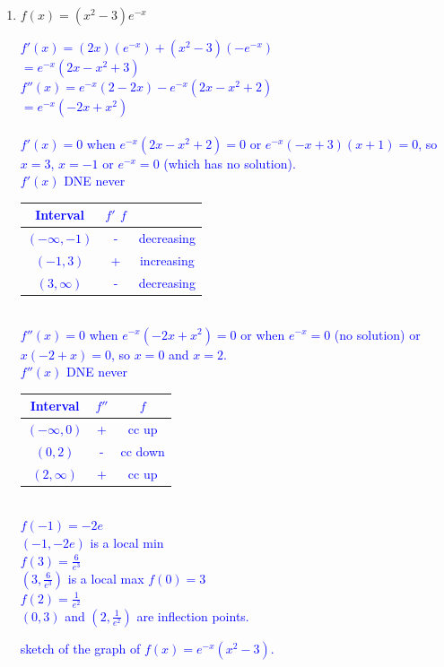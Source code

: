 \documentclass{ximera}
\begin{document}
\begin{exercise}
\begin{enumerate}
    \item $f(x)=(x^2-3)e^{-x}$ \\
    \textcolor{blue}{$f'(x)=(2x)(e^{-x})+(x^2-3)(-e^{-x})$\\
    $=e^{-x}(2x-x^2+3)$\\
    $f''(x)=e^{-x}(2-2x)-e^{-x}(2x-x^2+2)$\\
    $=e^{-x}(-2x+x^2)$\\
    \\
    $f'(x)=0$ when $e^{-x}(2x-x^2+2)=0$ or $e^{-x}(-x+3)(x+1)=0$, so $x=3$, $x=-1$ or $e^{-x}=0$ (which has no solution).\\
    $f'(x)$ DNE never\\
    \begin{tabular}{c|c|c}
        Interval & $f'$ $f$ \\ \hline
        $(-\infty,-1)$ & - & decreasing\\
        $(-1,3)$ & + & increasing \\
        $(3,\infty)$ & - & decreasing\\    
    \end{tabular}
    \\
    $f''(x)=0$ when $e^{-x}(-2x+x^2)=0$ or when $e^{-x}=0$ (no solution) or $x(-2+x)=0$, so $x=0$ and $x=2$.\\
    $f''(x)$ DNE never\\
    \begin{tabular}{c|c|c}
        Interval & $f''$ & $f$\\ \hline
        $(-\infty, 0)$ & + & cc up \\
        $(0,2)$ & - & cc down \\
        $(2,\infty)$ & + & cc up \\
    \end{tabular}
    \\
    $f(-1)=-2e$ \\
    $(-1,-2e)$ is a local min\\
    $f(3)=\frac{6}{e^3}$\\
    $(3,\frac{6}{e^3})$ is a local max
    $f(0)=3$\\
    $f(2)=\frac{1}{e^2}$\\
    $(0,3)$ and $(2,\frac{1}{e^2})$ are inflection points.\\
    \begin{image} 
    \end{image}
    \xmalt sketch of the graph of $f(x)=e^{-x}(x^2-3)$.
    }


\end{enumerate}
\end{exercise}
\end{document}
